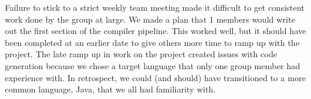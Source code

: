 

Failure to stick to a strict weekly team meeting made it difficult to get consistent work done by the group at large.
We made a plan that 1  members would write out the first section of the compiler pipeline.
This worked well, but it should have been completed at an earlier date to give others more time to ramp up with the project.
The late ramp up in work on the project created issues with code generation because we chose a target language that only one group member had experience with.
In retrospect, we could (and should) have transitioned to a more common language, Java, that we all had familiarity with.





